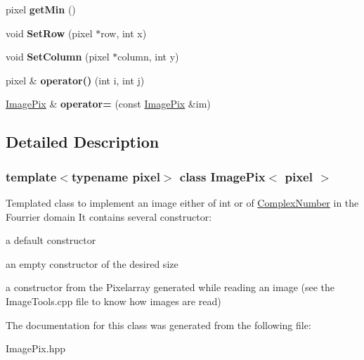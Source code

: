 \begin{DoxyCompactItemize}
pixel {\bfseries get\+Min} ()
\item 
\mbox{\label{class_image_pix_a640b8600e6184695c536555c40535f05}} 
void {\bfseries Set\+Row} (pixel $\ast$row, int x)
\item 
\mbox{\label{class_image_pix_a93d91ee1aa9da87ea1cb4b0b302fe5d2}} 
void {\bfseries Set\+Column} (pixel $\ast$column, int y)
\item 
\mbox{\label{class_image_pix_a34ec822d24acb1899470251f515f703c}} 
pixel \& {\bfseries operator()} (int i, int j)
\item 
\mbox{\label{class_image_pix_a222c1bf56e0f14be03094c9eb81b6fc1}} 
\hyperlink{class_image_pix}{Image\+Pix} \& {\bfseries operator=} (const \hyperlink{class_image_pix}{Image\+Pix} \&im)
\end{DoxyCompactItemize}


\subsection{Detailed Description}
\subsubsection*{template$<$typename pixel$>$\newline
class Image\+Pix$<$ pixel $>$}

Templated class to implement an image either of int or of \hyperlink{class_complex_number}{Complex\+Number} in the Fourrier domain It contains several constructor\+:
\begin{DoxyItemize}
\item a default constructor
\item an empty constructor of the desired size
\item a constructor from the Pixelarray generated while reading an image (see the Image\+Tools.\+cpp file to know how images are read) 
\end{DoxyItemize}

The documentation for this class was generated from the following file\+:\begin{DoxyCompactItemize}
\item 
Image\+Pix.\+hpp\end{DoxyCompactItemize}
